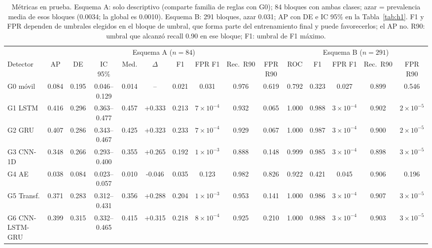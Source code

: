 \begin{table}[t]\centering\scriptsize\setlength{\tabcolsep}{2.6pt}
\caption{M\'etricas en prueba. Esquema A: solo descriptivo (comparte familia de reglas con G0); 84 bloques con ambas clases; azar = prevalencia media de esos bloques (0.0034; la global es 0.0010). Esquema B: 291 bloques, azar 0.031; AP con DE e IC 95\% en la Tabla~\ref{tab:h1}. F1 y FPR dependen de umbrales elegidos en el bloque de umbral, que forma parte del entrenamiento final y puede favorecerlos; el AP no. R90: umbral que alcanz\'o recall 0.90 en ese bloque; F1: umbral de F1 m\'aximo.}
\label{tab:secund}
\begin{tabular}{@{}l|ccccccccc|ccccc@{}}\toprule
& \multicolumn{9}{c|}{Esquema A ($n=84$)} & \multicolumn{5}{c}{Esquema B ($n=291$)} \\
Detector & AP & DE & IC 95\% & Med. & $\Delta$ & F1 & FPR F1 & Rec.\ R90 & FPR R90 & ROC & F1 & FPR F1 & Rec.\ R90 & FPR R90 \\\midrule
G0 m\'ovil & 0.084 & 0.195 & 0.046--0.129 & 0.014 & -- & 0.021 & 0.031 & 0.976 & 0.619 & 0.792 & 0.323 & 0.027 & 0.899 & 0.546 \\
G1 LSTM & 0.416 & 0.296 & 0.363--0.477 & 0.457 & +0.333 & 0.213 & $7\!\times\!10^{-4}$ & 0.932 & 0.065 & 1.000 & 0.988 & $3\!\times\!10^{-4}$ & 0.902 & $2\!\times\!10^{-5}$ \\
G2 GRU & 0.407 & 0.286 & 0.343--0.467 & 0.425 & +0.323 & 0.233 & $7\!\times\!10^{-4}$ & 0.929 & 0.067 & 1.000 & 0.987 & $3\!\times\!10^{-4}$ & 0.900 & $2\!\times\!10^{-5}$ \\
G3 CNN-1D & 0.348 & 0.266 & 0.293--0.400 & 0.355 & +0.265 & 0.192 & $1\!\times\!10^{-3}$ & 0.888 & 0.148 & 0.999 & 0.985 & $3\!\times\!10^{-4}$ & 0.898 & $3\!\times\!10^{-5}$ \\
G4 AE & 0.038 & 0.084 & 0.023--0.057 & 0.010 & -0.046 & 0.035 & 0.123 & 0.982 & 0.826 & 0.922 & 0.421 & 0.045 & 0.906 & 0.196 \\
G5 Transf. & 0.371 & 0.283 & 0.312--0.431 & 0.356 & +0.288 & 0.204 & $1\!\times\!10^{-3}$ & 0.953 & 0.141 & 1.000 & 0.986 & $3\!\times\!10^{-4}$ & 0.907 & $3\!\times\!10^{-5}$ \\
G6 CNN-LSTM-GRU & 0.399 & 0.315 & 0.332--0.465 & 0.415 & +0.315 & 0.218 & $8\!\times\!10^{-4}$ & 0.925 & 0.210 & 1.000 & 0.988 & $3\!\times\!10^{-4}$ & 0.903 & $3\!\times\!10^{-5}$ \\
\bottomrule\end{tabular}\end{table}

